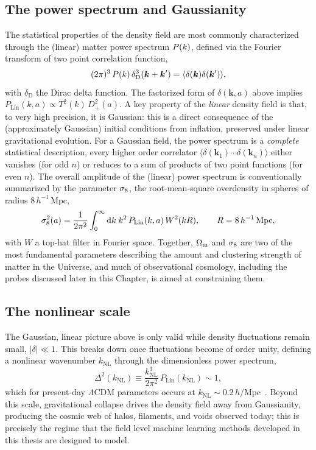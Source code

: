 \subsection{The power spectrum and Gaussianity}
The statistical properties of the density field are most commonly characterized through the (linear) matter power spectrum $P(k)$, defined via the Fourier transform of two point correlation function,
\begin{equation}
    (2\pi)^3\,P(k)\,\delta_\text{D}^3(\bm{k}+\bm{k}') = \langle\delta(\bm{k})\delta(\bm{k}')\rangle,
\end{equation}
with $\delta_\text{D}$ the Dirac delta function. The factorized form of $\delta(\bm{k},a)$ above implies $P_\text{Lin}(k,a)\propto T^2(k)\,D_+^2(a)$. A key property of the \emph{linear} density field is that, to very high precision, it is Gaussian: this is a direct consequence of the (approximately Gaussian) initial conditions from inflation, preserved under linear gravitational evolution. For a Gaussian field, the power spectrum is a \emph{complete} statistical description, every higher order correlator $\langle\delta(\bm{k}_1)\cdots\delta(\bm{k}_n)\rangle$ either vanishes (for odd $n$) or reduces to a sum of products of two point functions (for even $n$). The overall amplitude of the (linear) power spectrum is conventionally summarized by the parameter $\sigma_8$, the root-mean-square overdensity in spheres of radius $8\,h^{-1}\,\mathrm{Mpc}$,
\begin{equation}
    \sigma_8^2(a) = \frac{1}{2\pi^2}\int_0^\infty \text{d}k\; k^2\, P_\text{Lin}(k,a)\, W^2(kR), \qquad R = 8\,h^{-1}\,\mathrm{Mpc},
\end{equation}
with $W$ a top-hat filter in Fourier space. Together, $\Omega_\mathrm{m}$ and $\sigma_8$ are two of the most fundamental parameters describing the amount and clustering strength of matter in the Universe, and much of observational cosmology, including the probes discussed later in this Chapter, is aimed at constraining them.

\subsection{The nonlinear scale}

The Gaussian, linear picture above is only valid while density fluctuations remain small, $|\delta|\ll1$. This breaks down once fluctuations become of order unity, defining a nonlinear wavenumber $k_\text{NL}$ through the dimensionless power spectrum,
\begin{equation}
    \Delta^2(k_\text{NL}) \equiv \frac{k_\text{NL}^3}{2\pi^2}\,P_\text{Lin}(k_\text{NL}) \sim 1,
\end{equation}
which for present-day $\Lambda$CDM parameters occurs at $k_\text{NL}\sim0.2\,h/\mathrm{Mpc}$~\citep{Takahashi:2012}. Beyond this scale, gravitational collapse drives the density field away from Gaussianity, producing the cosmic web of halos, filaments, and voids observed today; this is precisely the regime that the field level machine learning methods developed in this thesis are designed to model.

